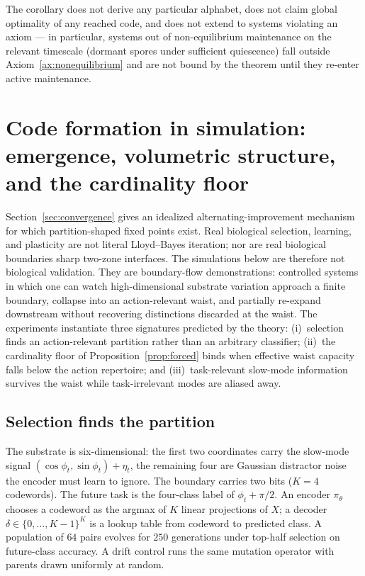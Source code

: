\documentclass[12pt]{article}
\theoremstyle{definition}
\begin{document}
The corollary does not derive any particular alphabet, does not claim global optimality of any reached code, and does not extend to systems violating an axiom --- in particular, systems out of non-equilibrium maintenance on the relevant timescale (dormant spores under sufficient quiescence) fall outside Axiom~\ref{ax:nonequilibrium} and are not bound by the theorem until they re-enter active maintenance.

\section{Code formation in simulation: emergence, volumetric structure, and the cardinality floor}
\label{sec:emergence}

Section~\ref{sec:convergence} gives an idealized alternating-improvement mechanism for which partition-shaped fixed points exist. Real biological selection, learning, and plasticity are not literal Lloyd--Bayes iteration; nor are real biological boundaries sharp two-zone interfaces. The simulations below are therefore not biological validation. They are boundary-flow demonstrations: controlled systems in which one can watch high-dimensional substrate variation approach a finite boundary, collapse into an action-relevant waist, and partially re-expand downstream without recovering distinctions discarded at the waist. The experiments instantiate three signatures predicted by the theory: (i)~selection finds an action-relevant partition rather than an arbitrary classifier; (ii)~the cardinality floor of Proposition~\ref{prop:forced} binds when effective waist capacity falls below the action repertoire; and (iii)~task-relevant slow-mode information survives the waist while task-irrelevant modes are aliased away.

\subsection{Selection finds the partition}

The substrate is six-dimensional: the first two coordinates carry the slow-mode signal $(\cos\phi_t,\sin\phi_t)+\eta_t$, the remaining four are Gaussian distractor noise the encoder must learn to ignore. The boundary carries two bits ($K=4$ codewords). The future task is the four-class label of $\phi_t+\pi/2$. An encoder $\pi_\theta$ chooses a codeword as the argmax of $K$ linear projections of $X$; a decoder $\delta\in\{0,\ldots,K-1\}^K$ is a lookup table from codeword to predicted class. A population of $64$ pairs evolves for $250$ generations under top-half selection on future-class accuracy. A drift control runs the same mutation operator with parents drawn uniformly at random.
\end{document}
